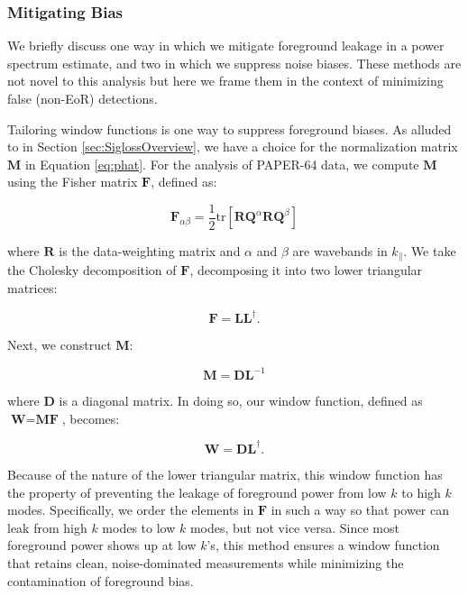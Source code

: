 \documentclass[preprint2,numberedappendix,tighten]{aastex6}  %
\begin{document}
\subsubsection{Mitigating Bias}

We briefly discuss one way in which we mitigate foreground leakage in a power spectrum estimate, and two in which we suppress noise biases. These methods are not novel to this analysis but here we frame them in the context of minimizing false (non-EoR) detections.

Tailoring window functions is one way to suppress foreground biases. As alluded to in Section \ref{sec:SiglossOverview}, we have a choice for the normalization matrix $\textbf{M}$ in Equation \eqref{eq:phat}. For the analysis of PAPER-64 data, we compute $\textbf{M}$ using the Fisher matrix $\textbf{F}$, defined as:

\begin{equation}
\textbf{F}_{\alpha\beta} = \frac{1}{2} \text{tr} [\textbf{R}\textbf{Q}^{\alpha}\textbf{R}\textbf{Q}^{\beta} ]
\end{equation}

\noindent where $\textbf{R}$ is the data-weighting matrix and $\alpha$ and $\beta$ are wavebands in $k_{\parallel}$. We take the Cholesky decomposition of $\textbf{F}$, decomposing it into two lower triangular matrices:

\begin{equation}
\textbf{F} = \textbf{LL}^{\dagger}.
\end{equation}

\noindent Next, we construct $\textbf{M}$:

\begin{equation}
\textbf{M} = \textbf{DL}^{-1}
\end{equation}

\noindent where $\textbf{D}$ is a diagonal matrix. In doing so, our window function, defined as $\textbf{W} = \textbf{MF}$, becomes:

\begin{equation}
\textbf{W} = \textbf{DL}^{\dagger}.
\end{equation}

\noindent Because of the nature of the lower triangular matrix, this window function has the property of preventing the leakage of foreground power from low $k$ to high $k$ modes. Specifically, we order the elements in $\textbf{F}$ in such a way so that power can leak from high $k$ modes to low $k$ modes, but not vice versa. Since most foreground power shows up at low $k$'s, this method ensures a window function that retains clean, noise-dominated measurements while minimizing the contamination of foreground bias.
\end{document}
